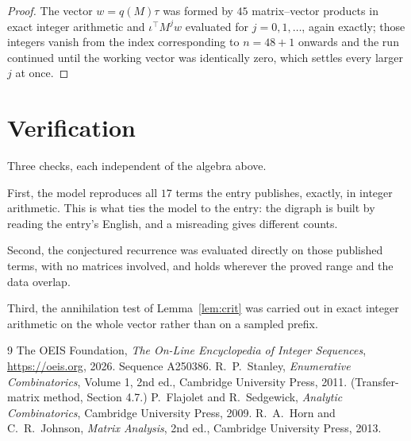 \documentclass[11pt,a4paper]{article}
\theoremstyle{plain}
\theoremstyle{definition}
\begin{document}
\begin{proof}
The vector $w=q(M)\tau$ was formed by $45$ matrix--vector products in exact integer
arithmetic and $\iota^{\!\top}M^{j}w$ evaluated for $j=0,1,\dots$, again exactly; those
integers vanish from the index corresponding to $n=48+1$ onwards and the run continued
until the working vector was identically zero, which settles every larger $j$ at once.
\end{proof}

\section{Verification}

Three checks, each independent of the algebra above.

First, the model reproduces all $17$ terms the entry publishes, exactly, in integer
arithmetic. This is what ties the model to the entry: the digraph is built by reading the
entry's English, and a misreading gives different counts.

Second, the conjectured recurrence was evaluated directly on those published terms, with no
matrices involved, and holds wherever the proved range and the data overlap.

Third, the annihilation test of Lemma~\ref{lem:crit} was carried out in exact integer
arithmetic on the whole vector rather than on a sampled prefix.

\begin{thebibliography}{9}
 The OEIS Foundation, \emph{The On-Line Encyclopedia of Integer
Sequences}, \url{https://oeis.org}, 2026. Sequence A250386.
 R.~P.~Stanley, \emph{Enumerative Combinatorics}, Volume 1, 2nd ed.,
Cambridge University Press, 2011. (Transfer-matrix method, Section 4.7.)
 P.~Flajolet and R.~Sedgewick, \emph{Analytic Combinatorics}, Cambridge
University Press, 2009.
 R.~A.~Horn and C.~R.~Johnson, \emph{Matrix Analysis}, 2nd ed., Cambridge
University Press, 2013.
\end{thebibliography}
\end{document}
